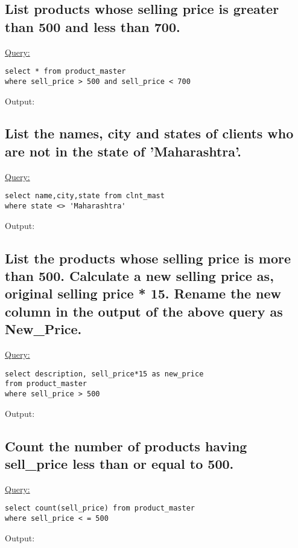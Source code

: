 \documentclass[a4paper,11pt]{article}
\begin{document}
\subsection{List products whose selling price is greater than 500 and less than 700.}
\underline{Query:}
\begin{lstlisting}[showstringspaces=false]
select * from product_master
where sell_price > 500 and sell_price < 700
\end{lstlisting}
Output:
\begin{figure}[H]
\centering
{}
\end{figure}
\bigskip

\subsection{List the names, city and states of clients who are not in the state of 'Maharashtra'.}
\underline{Query:}
\begin{lstlisting}[showstringspaces=false]
select name,city,state from clnt_mast
where state <> 'Maharashtra'

\end{lstlisting}
Output:
\begin{figure}[H]
\centering
{}
\end{figure}
\bigskip

\subsection{List the products whose selling price is more than 500. Calculate a new selling price as, original selling price * 15. Rename the new column in the output of the above query as New\_Price.}
\underline{Query:}
\begin{lstlisting}[showstringspaces=false]
select description, sell_price*15 as new_price 
from product_master
where sell_price > 500
\end{lstlisting}
Output:
\begin{figure}[H]
\centering
\footnotesize{}
\end{figure}
\bigskip
\subsection{Count the number of products having sell\_price less than or equal to 500.}
\underline{Query:}
\begin{lstlisting}[showstringspaces=false]
select count(sell_price) from product_master
where sell_price < = 500
\end{lstlisting}
Output:
\begin{figure}[H]
\centering
{}
\end{figure}
\bigskip
\end{document}
